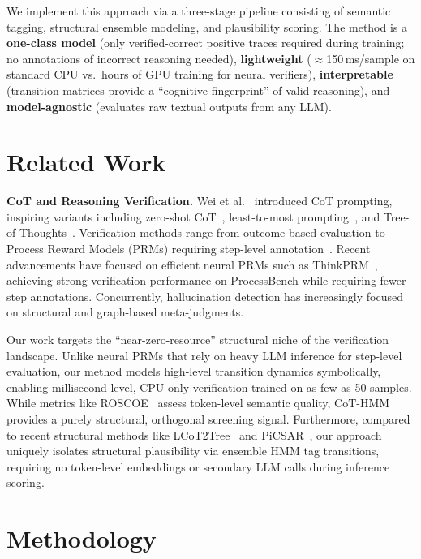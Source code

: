 \documentclass[runningheads]{llncs}
\begin{document}
We implement this approach via a three-stage pipeline consisting of semantic tagging, structural ensemble modeling, and plausibility scoring. The method is a \textbf{one-class model} (only verified-correct positive traces required during training; no annotations of incorrect reasoning needed), \textbf{lightweight} ($\approx$150\,ms/sample on standard CPU vs.\ hours of GPU training for neural verifiers), \textbf{interpretable} (transition matrices provide a ``cognitive fingerprint'' of valid reasoning), and \textbf{model-agnostic} (evaluates raw textual outputs from any LLM).

\section{Related Work}

\textbf{CoT and Reasoning Verification.} Wei et al.~\cite{wei2022chain} introduced CoT prompting, inspiring variants including zero-shot CoT~\cite{kojima2022large}, least-to-most prompting~\cite{zhou2023least}, and Tree-of-Thoughts~\cite{yao2023tree}. Verification methods range from outcome-based evaluation to Process Reward Models (PRMs) requiring step-level annotation~\cite{lightman2024let,wang-etal-2024-math-shepherd}. Recent advancements have focused on efficient neural PRMs such as ThinkPRM~\cite{khalifa2025}, achieving strong verification performance on ProcessBench while requiring fewer step annotations. Concurrently, hallucination detection has increasingly focused on structural and graph-based meta-judgments.

Our work targets the ``near-zero-resource'' structural niche of the verification landscape. Unlike neural PRMs that rely on heavy LLM inference for step-level evaluation, our method models high-level transition dynamics symbolically, enabling millisecond-level, CPU-only verification trained on as few as 50 samples. While metrics like ROSCOE~\cite{golovneva2023roscoe} assess token-level semantic quality, CoT-HMM provides a purely structural, orthogonal screening signal. Furthermore, compared to recent structural methods like LCoT2Tree~\cite{lcot2tree2025} and PiCSAR~\cite{picsar2025}, our approach uniquely isolates structural plausibility via ensemble HMM tag transitions, requiring no token-level embeddings or secondary LLM calls during inference scoring.

\section{Methodology}
\end{document}
